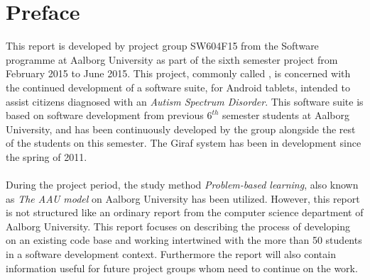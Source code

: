 
\chapter*{Preface}

This report is developed by project group SW604F15 from the Software programme at Aalborg University as part of the sixth semester project from February 2015 to June 2015. This project, commonly called \giraf,  is concerned with the continued development of a software suite, for Android tablets, intended to assist citizens diagnosed with an \emph{Autism Spectrum Disorder}. This software suite is based on software development from previous $6^{th}$ semester students at Aalborg University, and has been continuously developed by the group alongside the rest of the students on this semester. 
The Giraf system has been in development since the spring of 2011.
\\\\
During the project period, the study method \emph{Problem-based learning}, also known as \emph{The AAU model} on Aalborg University has been utilized. However, this report is not structured like an ordinary report from the computer science department of Aalborg University. This report focuses on describing the process of developing on an existing code base and working intertwined with the more than 50 students in a software development context. Furthermore the report will also contain information useful for future project groups whom need to continue on the work.

